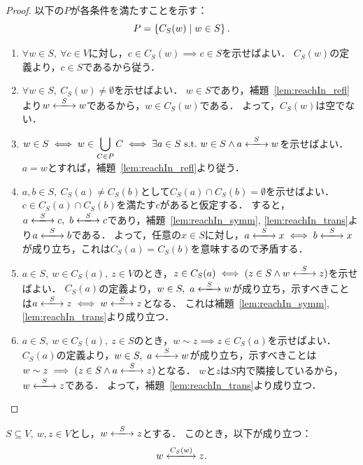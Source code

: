 \begin{proof}
  以下の$P$が各条件を満たすことを示す：
  \begin{equation}
    P = \left\lbrace C_S(w) \mathrel{} \middle| \mathrel{} w \in S \right\rbrace.
  \end{equation}
  \begin{enumerate}[label = (\arabic*)]
    \item $\forall w \in S,\ \forall c \in V$に対し，$c \in C_S(w) \implies c \in S$を示せばよい．
    $C_S(w)$の定義より，$c \in S$であるから従う．
    
    \item $\forall w \in S,\ C_S(w) \ne \emptyset$を示せばよい．
    $w \in S$であり，補題~\ref{lem:reachIn_refl}より$w \reach{S} w$であるから，$w \in C_S(w)$である．
    よって，$C_S(w)$は空でない．

    \item $w \in S \iff w \in \displaystyle \bigcup_{C \in P} C \iff \exists a \in S \st w \in S \land a \reach{S} w$を示せばよい．
    $a = w$とすれば，補題~\ref{lem:reachIn_refl}より従う．

    \item $a, b \in S,\ C_S(a) \ne C_S(b)$として$C_S(a) \cap C_S(b) = \emptyset$を示せばよい．
    $c \in C_S(a) \cap C_S(b)$を満たす$c$があると仮定する．
    すると，$a \reach{S} c,\ b \reach{S} c$であり，補題~\ref{lem:reachIn_symm}, \ref{lem:reachIn_trans}より$a \reach{S} b$である．
    よって，任意の$x \in S$に対し，$a \reach{S} x \iff b \reach{S} x$が成り立ち，これは$C_S(a) = C_S(b)$を意味するので矛盾する．

    \item $a \in S,\ w \in C_S(a),\ z \in V$のとき，$z \in C_S(a) \iff (z \in S \land w \reach{S} z)$を示せばよい．
    $C_S(a)$の定義より，$w \in S,\ a \reach{S} w$が成り立ち，示すべきことは$a \reach{S} z \iff w \reach{S} z$となる．
    これは補題~\ref{lem:reachIn_symm}, \ref{lem:reachIn_trans}より成り立つ．

    \item $a \in S,\ w \in C_S(a),\ z \in S$のとき，$w \sim z \implies z \in C_S(a)$を示せばよい．
    $C_S(a)$の定義より，$w \in S,\ a \reach{S} w$が成り立ち，示すべきことは$w \sim z \implies (z \in S \land a \reach{S} z)$となる．
    $w$と$z$は$S$内で隣接しているから，$w \reach{S} z$である．
    よって，補題~\ref{lem:reachIn_trans}より成り立つ．
  \end{enumerate}
\end{proof}

\begin{lemma}
  \label{lem:reachIn_confine}
  \leanok
  \uses{}
  $S \subseteq V,\ w, z \in V$とし，$w \reach{S} z$とする．
  このとき，以下が成り立つ：
  \begin{equation}
    w \reach{C_S(w)} z.
  \end{equation}
\end{lemma}

